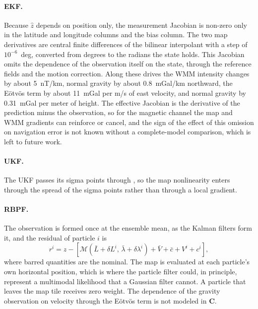 \paragraph{EKF.} Because \(\hat{z}\) depends on position only, the measurement Jacobian is non-zero only in the latitude and longitude columns and the bias column. The two map derivatives are central finite differences of the bilinear interpolant with a step of \(10^{-6}\)~deg, converted from degrees to the radians the state holds. This Jacobian omits the dependence of the observation itself on the state, through the reference fields and the motion correction. Along these drives the WMM intensity changes by about 5~nT/km, normal gravity by about 0.8~mGal/km northward, the E\"{o}tv\"{o}s term by about 11~mGal per m/s of east velocity, and normal gravity by 0.31~mGal per meter of height. The effective Jacobian is the derivative of the prediction minus the observation, so for the magnetic channel the map and WMM gradients can reinforce or cancel, and the sign of the effect of this omission on navigation error is not known without a complete-model comparison, which is left to future work.

\paragraph{UKF.} The UKF passes its sigma points through , so the map nonlinearity enters through the spread of the sigma points rather than through a local gradient.

\paragraph{RBPF.} The observation is formed once at the ensemble mean, as the Kalman filters form it, and the residual of particle \(i\) is
\begin{equation}
  r^i = z - \left[\mathcal{M}(\bar{L} + \delta L^i,\,\bar{\lambda} + \delta\lambda^i) + \bar{V} + \bar{c} + V^i + c^i\right],
  \label{eqn:rbpf-map-residual}
\end{equation}
where barred quantities are the nominal. The map is evaluated at each particle's own horizontal position, which is where the particle filter could, in principle, represent a multimodal likelihood that a Gaussian filter cannot. A particle that leaves the map tile receives zero weight. The dependence of the gravity observation on velocity through the E\"{o}tv\"{o}s term is not modeled in \(\mathbf{C}\).

